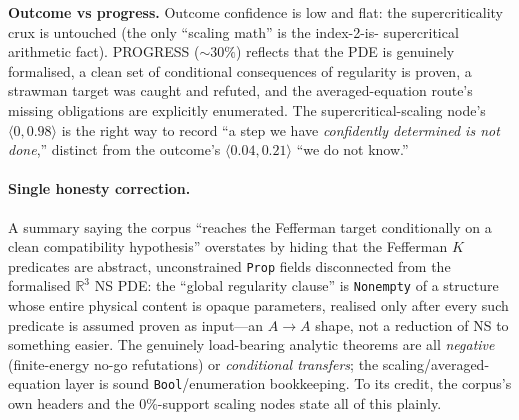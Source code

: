 \noindent\textbf{Outcome vs progress.} Outcome confidence is low and flat: the
supercriticality crux is untouched (the only ``scaling math'' is the index-2-is-
supercritical arithmetic fact). PROGRESS ($\sim 30\%$) reflects that the PDE is
genuinely formalised, a clean set of conditional consequences of regularity is
proven, a strawman target was caught and refuted, and the averaged-equation
route's missing obligations are explicitly enumerated. The supercritical-scaling
node's $\langle 0,0.98\rangle$ is the right way to record ``a step we have
\emph{confidently determined is not done},'' distinct from the outcome's
$\langle 0.04,0.21\rangle$ ``we do not know.''

\paragraph{Single honesty correction.}
A summary saying the corpus ``reaches the Fefferman target conditionally on a
clean compatibility hypothesis'' overstates by hiding that the Fefferman $K$
predicates are abstract, unconstrained \texttt{Prop} fields disconnected from the
formalised $\mathbb{R}^3$ NS PDE: the ``global regularity clause'' is
\texttt{Nonempty} of a structure whose entire physical content is opaque
parameters, realised only after every such predicate is assumed proven as
input---an $A\to A$ shape, not a reduction of NS to something easier. The
genuinely load-bearing analytic theorems are all \emph{negative} (finite-energy
no-go refutations) or \emph{conditional transfers}; the scaling/averaged-equation
layer is sound \texttt{Bool}/enumeration bookkeeping. To its credit, the corpus's
own headers and the $0\%$-support scaling nodes state all of this plainly.
